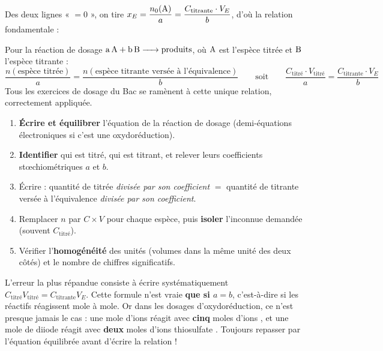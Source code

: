 \documentclass[11pt]{article}
\begin{document}
Des deux lignes « $=0$ », on tire $x_E = \dfrac{n_0(\ce{A})}{a} = \dfrac{C_{\text{titrante}} \cdot V_E}{b}$, d'où la relation fondamentale :

\begin{aretenir}
Pour la réaction de dosage $\ce{a\,A + b\,B -> produits}$, où $\ce{A}$ est l'espèce titrée et $\ce{B}$ l'espèce titrante :
\[ \frac{n(\text{espèce titrée})}{a} = \frac{n(\text{espèce titrante versée à l'équivalence})}{b} \qquad \text{soit} \qquad \frac{C_{\text{titré}} \cdot V_{\text{titré}}}{a} = \frac{C_{\text{titrante}} \cdot V_E}{b} \]
Tous les exercices de dosage du Bac se ramènent à cette unique relation, correctement appliquée.
\end{aretenir}

\begin{methode}
\begin{enumerate}
\item \textbf{Écrire et équilibrer} l'équation de la réaction de dosage (demi-équations électroniques si c'est une oxydoréduction).
\item \textbf{Identifier} qui est titré, qui est titrant, et relever leurs coefficients stœchiométriques $a$ et $b$.
\item Écrire : quantité de titrée \emph{divisée par son coefficient} $=$ quantité de titrante versée à l'équivalence \emph{divisée par son coefficient}.
\item Remplacer $n$ par $C \times V$ pour chaque espèce, puis \textbf{isoler} l'inconnue demandée (souvent $C_{\text{titré}}$).
\item Vérifier l'\textbf{homogénéité} des unités (volumes dans la même unité des deux côtés) et le nombre de chiffres significatifs.
\end{enumerate}
\end{methode}

\begin{attention}
L'erreur la plus répandue consiste à écrire systématiquement $C_{\text{titré}} V_{\text{titré}} = C_{\text{titrante}} V_E$. Cette formule n'est vraie \textbf{que si $a = b$}, c'est-à-dire si les réactifs réagissent mole à mole. Or dans les dosages d'oxydoréduction, ce n'est presque jamais le cas : une mole d'ions  réagit avec \textbf{cinq} moles d'ions , et une mole de diiode  réagit avec \textbf{deux} moles d'ions thiosulfate . Toujours repasser par l'équation équilibrée avant d'écrire la relation !
\end{attention}
\end{document}

